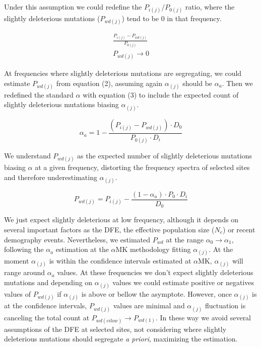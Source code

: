 \documentclass[11pt]{article}
\begin{document}
Under this assumption we could redefine the $P_{i(j)}/P_{0(j)}$ ratio, where the slightly deleterious mutations ($P_{wd(j)}$) tend to be 0 in that frequency.

\begin{equation}
\begin{split}
	\frac{P_{i(j)}-P_{wd(j)}}{P_{0(j)}} \\ 	P_{wd(j)} \to 0
\end{split}
\end{equation}

At frequencies where slightly deleterious mutations are segregating, we could estimate $P_{wd(j)}$ from equation (2), assuming again $\alpha_{(j)}$ should be $\alpha_{a}$. Then we redefined the standard $\alpha$ with equation (3) to include the expected count of slightly deleterious mutations biasing $\alpha_{(j)}$.

\begin{equation}
	 \alpha_{a} = 1 - \frac{(P_{i(j)}-P_{wd(j)}) \cdot D_{0}}{P_{0(j)} \cdot D_{i}}
\end{equation}

We understand $P_{wd(j)}$ as the expected number of slightly deleterious mutations biasing $\alpha$ at a given frequency, distorting the frequency spectra of selected sites and therefore underestimating $\alpha_{(j)}$.

\begin{equation}
	 P_{wd(j)} = P_{i(j)} - \frac{(1-\alpha_{a}) \cdot P_{0} \cdot D_{i}}{D_{0}}
\end{equation}

We just expect slightly deleterious at low frequency, although it depends on several important factors as the DFE, the effective population size ($N_{e}$) or recent demography events. Nevertheless, we estimated $P_{wd}$ at the range $\alpha_{0} \to \alpha_{1}$, following the $\alpha_{a}$ estimation at the $\alpha$MK methodology fitting $\alpha_{(j)}$. At the moment $\alpha_{(j)}$ is within the confidence intervals estimated at $\alpha$MK, $\alpha_{(j)}$ will range around $\alpha_{a}$ values. At these frequencies we don't expect slightly deleterious mutations and depending on $\alpha_{(j)}$ values we could estimate positive or negatives values of $P_{wd(j)}$ if $\alpha_{(j)}$ is above or bellow the asymptote. However, once $\alpha_{(j)}$ is at the confidence intervals, $P_{wd(j)}$ values are minimal and $\alpha_{(j)}$ fluctuation is canceling the total count at $P_{wd(ci low)} \to P_{wd(1)}$. In these way we avoid several assumptions of the DFE at selected sites, not considering where slightly deleterious mutations should segregate \emph{a priori}, maximizing the estimation.
\end{document}
